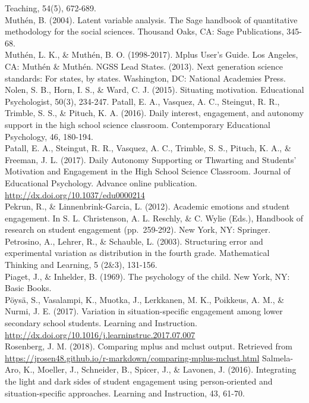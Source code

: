 \documentclass[]{book}
\theoremstyle{definition}
\theoremstyle{definition}
\theoremstyle{definition}
\theoremstyle{remark}
\begin{document}
Teaching, 54(5), 672-689.\\
Muthén, B. (2004). Latent variable analysis. The Sage handbook of
quantitative methodology for the social sciences. Thousand Oaks, CA:
Sage Publications, 345-68.\\
Muthén, L. K., \& Muthén, B. O. (1998-2017). Mplus User's Guide. Los
Angeles, CA: Muthén \& Muthén. NGSS Lead States. (2013). Next generation
science standards: For states, by states. Washington, DC: National
Academies Press.\\
Nolen, S. B., Horn, I. S., \& Ward, C. J. (2015). Situating motivation.
Educational Psychologist, 50(3), 234-247. Patall, E. A., Vasquez, A. C.,
Steingut, R. R., Trimble, S. S., \& Pituch, K. A. (2016). Daily
interest, engagement, and autonomy support in the high school science
classroom. Contemporary Educational Psychology, 46, 180-194.\\
Patall, E. A., Steingut, R. R., Vasquez, A. C., Trimble, S. S., Pituch,
K. A., \& Freeman, J. L. (2017). Daily Autonomy Supporting or Thwarting
and Students' Motivation and Engagement in the High School Science
Classroom. Journal of Educational Psychology. Advance online
publication. \url{http://dx.doi.org/10.1037/edu0000214}\\
Pekrun, R., \& Linnenbrink-Garcia, L. (2012). Academic emotions and
student engagement. In S. L. Christenson, A. L. Reschly, \& C. Wylie
(Eds.), Handbook of research on student engagement (pp.~259-292). New
York, NY: Springer. Petrosino, A., Lehrer, R., \& Schauble, L. (2003).
Structuring error and experimental variation as distribution in the
fourth grade. Mathematical Thinking and Learning, 5 (2\&3), 131-156.\\
Piaget, J., \& Inhelder, B. (1969). The psychology of the child. New
York, NY: Basic Books.\\
Pöysä, S., Vasalampi, K., Muotka, J., Lerkkanen, M. K., Poikkeus, A. M.,
\& Nurmi, J. E. (2017). Variation in situation-specific engagement among
lower secondary school students. Learning and Instruction.
\url{http://dx.doi.org/10.1016/j.learninstruc.2017.07.007}\\
Rosenberg, J. M. (2018). Comparing mplus and mclust output. Retrieved
from
\url{https://jrosen48.github.io/r-markdown/comparing-mplus-mclust.html}
Salmela-Aro, K., Moeller, J., Schneider, B., Spicer, J., \& Lavonen, J.
(2016). Integrating the light and dark sides of student engagement using
person-oriented and situation-specific approaches. Learning and
Instruction, 43, 61-70.\\
\end{document}
